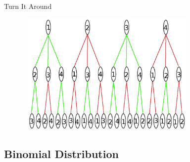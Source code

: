 \begin{frame}{Turn It Around}

  \includegraphics[width=11cm,height=6cm]{img/binomialTree}
  
\end{frame}

\subsection{Binomial Distribution}

